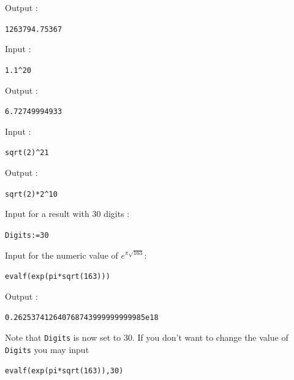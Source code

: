 \documentclass[a4paper,11pt]{book}
\begin{document}
Output :
\begin{center}{\tt 1263794.75367}\end{center}
Input :
\begin{center}{\tt 1.1\verb|^|{20}}\end{center}
Output :
\begin{center}{\tt 6.72749994933}\end{center}
Input :
\begin{center}{\tt sqrt(2)\verb|^|21}\end{center}
Output :
\begin{center}{\tt sqrt(2)*2\verb|^|10}\end{center}
Input for a result with 30 digits :
\begin{center}{\tt Digits:=30}\end{center}
Input for the numeric value of $e^{\pi\sqrt{163}}$:
\begin{center}{\tt evalf(exp(pi*sqrt(163)))}\end{center}
Output :
\begin{center}{\tt 0.262537412640768743999999999985e18}\end{center}
Note that {\tt Digits} is now set to 30. If you don't want to change
the value of {\tt Digits} you may input
\begin{center}{\tt evalf(exp(pi*sqrt(163)),30)}\end{center}
\end{document}
